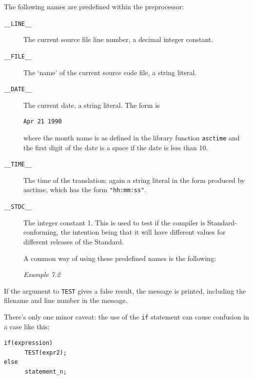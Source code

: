    The following names are predefined within the preprocessor:


   \begin{description}
    \item[\texttt{\_\_LINE\_\_}] The current source file line number, a decimal integer constant.

    \item[\texttt{\_\_FILE\_\_}] The `name' of the current source code file, a string
     literal.

    \item[\texttt{\_\_DATE\_\_}] 
     The current date, a string literal. The form is

     \begin{Verbatim}
Apr 21 1990
\end{Verbatim}

     where the month name is as defined in the library function
      \texttt{asctime} and the first digit of the date is a space if
      the date is less than 10.

    

    \item[\texttt{\_\_TIME\_\_}] The time of the translation; again a string literal in the form
     produced by asctime, which has the form \texttt{"hh:mm:ss"}.

    \item[\texttt{\_\_STDC\_\_}] 
     The integer constant 1. This is used to test if the compiler is
      Standard-conforming, the intention being that it will have different
      values for different releases of the Standard.

     A common way of using these predefined names is the following:


     \begin{center}\textit{Example 7.2}\end{center}


    
   \end{description}

   If the argument to \texttt{TEST} gives a false result, the message
    is printed, including the filename and line number in the message.


   There's only one minor caveat: the use of the \texttt{if}
    statement can cause confusion in a case like this:


   \begin{Verbatim}
if(expression)
      TEST(expr2);
else
      statement_n;
\end{Verbatim}

